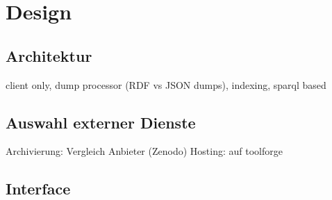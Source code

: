 \chapter{Design}

\section{Architektur}
client only, dump processor (RDF vs JSON dumps), indexing, sparql based

\section{Auswahl externer Dienste}
Archivierung: Vergleich Anbieter (Zenodo)
Hosting: auf toolforge

\section{Interface}
